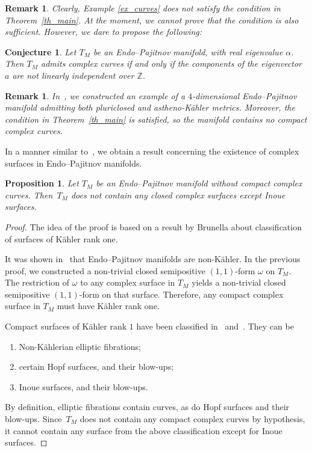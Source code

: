 \documentclass[pdftex]{sigma}
\newcommand{\6}{\partial}
\numberwithin{equation}{section}
\newtheorem{Proposition}[Theorem]{Proposition}
\newtheorem{Conjecture}[Theorem]{Conjecture}
\newtheorem{Remark}[Theorem]{Remark}
\begin{document}
\begin{Remark}
	Clearly, Example \ref{ex_curves} does not satisfy the condition in Theorem~\ref{th_main}. At the moment, we cannot prove that the condition is also sufficient. However, we dare to propose the following:
\end{Remark}

\begin{Conjecture}
	Let $T_M$ be an Endo--Pajitnov manifold, with real eigenvalue $\alpha$. Then $T_M$ admits complex curves if and only if the components of the eigenvector $a$ are not linearly independent over $\mathbb{Z}$.
\end{Conjecture}

\begin{Remark}
 In~\cite[Example 5.8]{cos}, we constructed an example of a $4$-dimensional Endo--Pajitnov manifold admitting both pluriclosed and astheno-K\"ahler metrics. Moreover, the condition in Theorem~\ref{th_main} is satisfied, so the manifold contains no compact complex curves.
\end{Remark}

In a manner similar to~\cite{v_2}, we obtain a result concerning the existence of complex surfaces in Endo--Pajitnov manifolds.

\begin{Proposition} \label{sup}
 Let $T_M$ be an Endo--Pajitnov manifold without compact complex curves. Then~$T_M$ does not contain any closed complex surfaces except Inoue surfaces.
\end{Proposition}

\begin{proof}
 The idea of the proof is based on a result by Brunella about classification of surfaces of K\"ahler rank one.

 It was shown in~\cite{pajitnov1} that Endo--Pajitnov manifolds are non-K\"ahler. In the previous proof, we constructed a non-trivial closed semipositive $(1,1)$-form $\omega$ on $T_M$. The restriction of $\omega$ to any complex surface in $T_M$ yields a non-trivial closed semipositive $(1,1)$-form on that surface. Therefore, any compact complex surface in $T_M$ must have K\"ahler rank one.

 Compact surfaces of K\"ahler rank $1$ have been classified in~\cite{ct} and~\cite{br}. They can be
 \begin{enumerate}\itemsep=0pt
 \item Non-K\"ahlerian elliptic fibrations;
 \item certain Hopf surfaces, and their blow-ups;
 \item Inoue surfaces, and their blow-ups.
\end{enumerate}

By definition, elliptic fibrations contain curves, as do Hopf surfaces and their blow-ups. Since~$T_M$ does not contain any compact complex curves by hypothesis, it cannot contain any surface from the above classification except for Inoue surfaces.
\end{proof}
\end{document}
